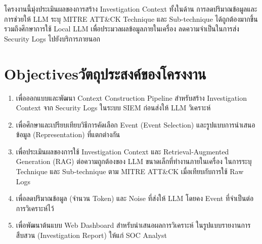 โครงงานนี้มุ่งประเมินผลของการสร้าง Investigation Context ทั้งในด้าน
การลดปริมาณข้อมูลและการช่วยให้ LLM ระบุ MITRE ATT\&CK Technique
และ Sub-technique ได้ถูกต้องมากขึ้น รวมถึงศึกษาการใช้ Local LLM
เพื่อประมวลผลข้อมูลภายในเครื่อง ลดความจำเป็นในการส่ง Security Logs
ไปยังบริการภายนอก


\section{\ifenglish Objectives\else วัตถุประสงค์ของโครงงาน\fi}
\begin{enumerate}
    \item เพื่อออกแบบและพัฒนา Context Construction Pipeline สำหรับสร้าง
          Investigation Context จาก Security Logs ในระบบ SIEM
          ก่อนส่งให้ LLM วิเคราะห์

    \item เพื่อศึกษาและเปรียบเทียบวิธีการคัดเลือก Event (Event Selection)
          และรูปแบบการนำเสนอข้อมูล (Representation) ที่แตกต่างกัน

    \item เพื่อประเมินผลของการใช้ Investigation Context และ
          Retrieval-Augmented Generation (RAG) ต่อความถูกต้องของ LLM
          ขนาดเล็กที่ทำงานภายในเครื่อง ในการระบุ Technique และ Sub-technique
          ตาม MITRE ATT\&CK เมื่อเทียบกับการใช้ Raw Logs

    \item เพื่อลดปริมาณข้อมูล (จำนวน Token) และ Noise ที่ส่งให้ LLM โดยคง Event ที่จำเป็นต่อการวิเคราะห์ไว้

    \item เพื่อพัฒนาต้นแบบ Web Dashboard สำหรับนำเสนอผลการวิเคราะห์
          ในรูปแบบรายงานการสืบสวน (Investigation Report)
          ให้แก่ SOC Analyst
\end{enumerate}

